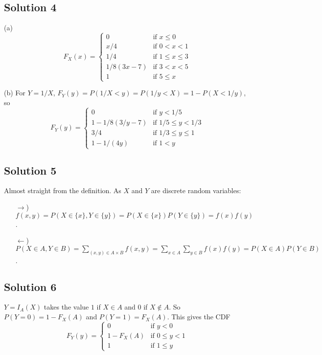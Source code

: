 \subsection*{Solution 4}

(a)
$$
F_X(x) = \left\{ \begin{array}{ll}
    0 & \text{if } x \leq 0 \\
    x/4 & \text{if } 0 < x < 1 \\
    1/4 & \text{if } 1 \leq x \leq 3 \\
    1/8(3x - 7) & \text{if } 3 < x < 5 \\
    1 & \text{if } 5 \leq x
\end{array} \right.
$$

(b) For $Y = 1/X$, $F_Y(y) = P(1/X < y) = P(1/y < X) = 1 - P(X < 1/y)$, so
$$
F_Y(y) = \left\{ \begin{array}{ll}
    0 & \text{if } y < 1/5 \\
    1 - 1/8(3/y - 7) & \text{if } 1/5 \leq y < 1/3 \\
    3/4 & \text{if } 1/3 \leq y \leq 1 \\
    1 - 1/(4y) & \text{if } 1 < y
\end{array} \right.
$$


\subsection*{Solution 5}

Almost straight from the definition.
As $X$ and $Y$ are discrete random variables:
\begin{itemize}
\item[$\rightarrow$)] $f(x, y) = P(X \in \{x\}, Y \in \{y\}) = P(X \in \{x\})P(Y \in \{y\}) = f(x)f(y)$.
\item[$\leftarrow$)] $P(X \in A, Y \in B) = \sum_{(x, y) \in A \times B} f(x, y) = \sum_{x \in A} \sum_{y \in B} f(x) f(y) = P(X \in A) P(Y \in B)$.
\end{itemize}


\subsection*{Solution 6}

$Y = I_A(X)$ takes the value $1$ if $X \in A$ and $0$ if $X \notin A$.
So $P(Y = 0) = 1 - F_X(A)$ and $P(Y = 1) = F_X(A)$.
This gives the CDF
$$
F_Y(y) = \left\{ \begin{array}{ll}
    0 & \text{if } y < 0 \\
    1 - F_X(A) & \text{if } 0 \leq y < 1 \\
    1 & \text{if } 1 \leq y
\end{array} \right.
$$
